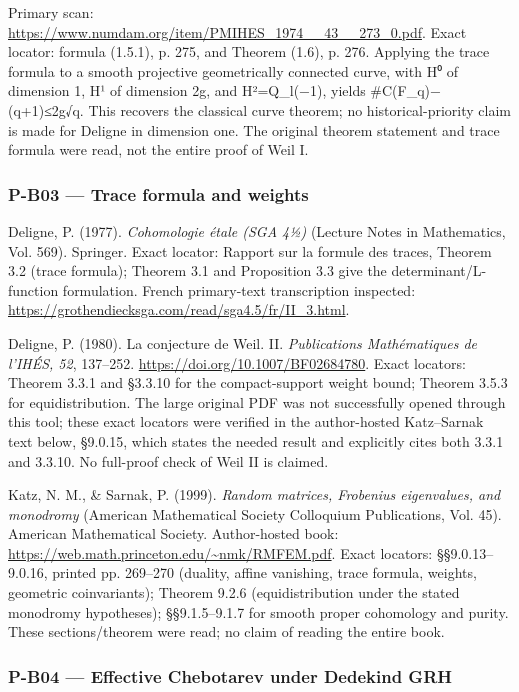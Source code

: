 \documentclass[11pt,a4paper]{article}
\theoremstyle{definition}\newtheorem{definition}{Definition}
\begin{document}
Primary scan:
\url{https://www.numdam.org/item/PMIHES_1974__43__273_0.pdf}. Exact
locator: formula (1.5.1), p. 275, and Theorem (1.6), p. 276. Applying
the trace formula to a smooth projective geometrically connected curve,
with H⁰ of dimension 1, H¹ of dimension 2g, and H²=Q\_l(−1), yields
\textbar\#C(F\_q)−(q+1)\textbar≤2g√q. This recovers the classical curve
theorem; no historical-priority claim is made for Deligne in dimension
one. The original theorem statement and trace formula were read, not the
entire proof of Weil I.

\subsubsection{P-B03 --- Trace formula and
weights}\label{p-b03--trace-formula-and-weights}

Deligne, P. (1977). \emph{Cohomologie étale (SGA 4½)} (Lecture Notes in
Mathematics, Vol. 569). Springer. Exact locator: Rapport sur la formule
des traces, Theorem 3.2 (trace formula); Theorem 3.1 and Proposition 3.3
give the determinant/L-function formulation. French primary-text
transcription inspected:
\url{https://grothendiecksga.com/read/sga4.5/fr/II_3.html}.

Deligne, P. (1980). La conjecture de Weil. II. \emph{Publications
Mathématiques de l'IHÉS, 52}, 137--252.
\url{https://doi.org/10.1007/BF02684780}. Exact locators: Theorem 3.3.1
and §3.3.10 for the compact-support weight bound; Theorem 3.5.3 for
equidistribution. The large original PDF was not successfully opened
through this tool; these exact locators were verified in the
author-hosted Katz--Sarnak text below, §9.0.15, which states the needed
result and explicitly cites both 3.3.1 and 3.3.10. No full-proof check
of Weil II is claimed.

Katz, N. M., \& Sarnak, P. (1999). \emph{Random matrices, Frobenius
eigenvalues, and monodromy} (American Mathematical Society Colloquium
Publications, Vol. 45). American Mathematical Society. Author-hosted
book: \url{https://web.math.princeton.edu/~nmk/RMFEM.pdf}. Exact
locators: §§9.0.13--9.0.16, printed pp. 269--270 (duality, affine
vanishing, trace formula, weights, geometric coinvariants); Theorem
9.2.6 (equidistribution under the stated monodromy hypotheses);
§§9.1.5--9.1.7 for smooth proper cohomology and purity. These
sections/theorem were read; no claim of reading the entire book.

\subsubsection{P-B04 --- Effective Chebotarev under Dedekind
GRH}\label{p-b04--effective-chebotarev-under-dedekind-grh}
\end{document}
